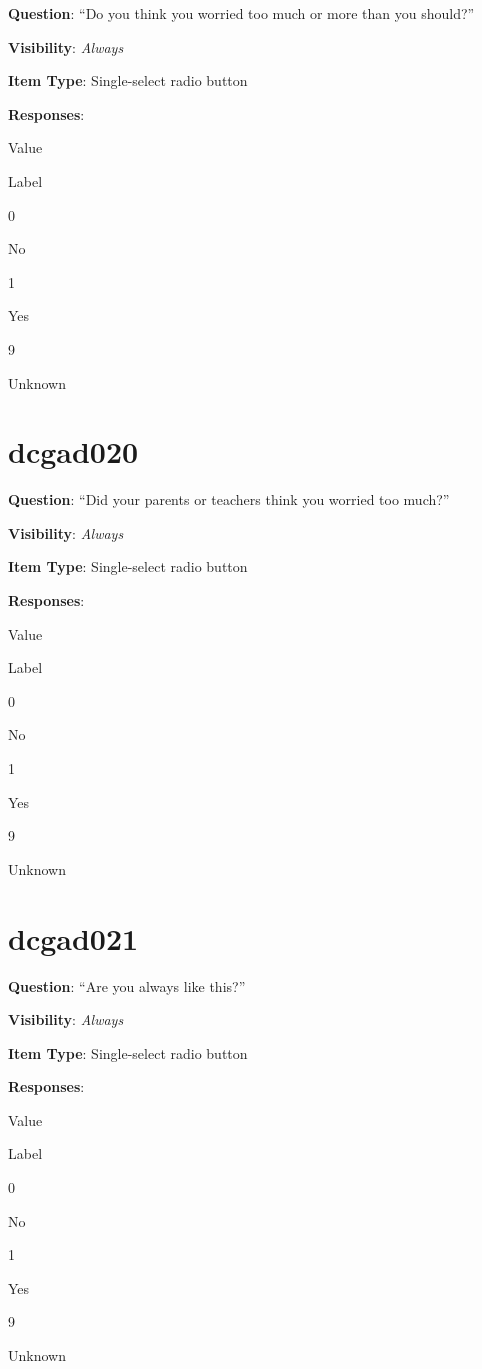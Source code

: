 \documentclass[]{book}
\begin{document}
\textbf{Question}: ``Do you think you worried too much or more than you should?''

\textbf{Visibility}: \emph{Always}

\textbf{Item Type}: Single-select radio button

\textbf{Responses}:

Value

Label

0

No

1

Yes

9

Unknown

\hypertarget{dcgad020}{%
\section{dcgad020}\label{dcgad020}}

\textbf{Question}: ``Did your parents or teachers think you worried too much?''

\textbf{Visibility}: \emph{Always}

\textbf{Item Type}: Single-select radio button

\textbf{Responses}:

Value

Label

0

No

1

Yes

9

Unknown

\hypertarget{dcgad021}{%
\section{dcgad021}\label{dcgad021}}

\textbf{Question}: ``Are you always like this?''

\textbf{Visibility}: \emph{Always}

\textbf{Item Type}: Single-select radio button

\textbf{Responses}:

Value

Label

0

No

1

Yes

9

Unknown
\end{document}
